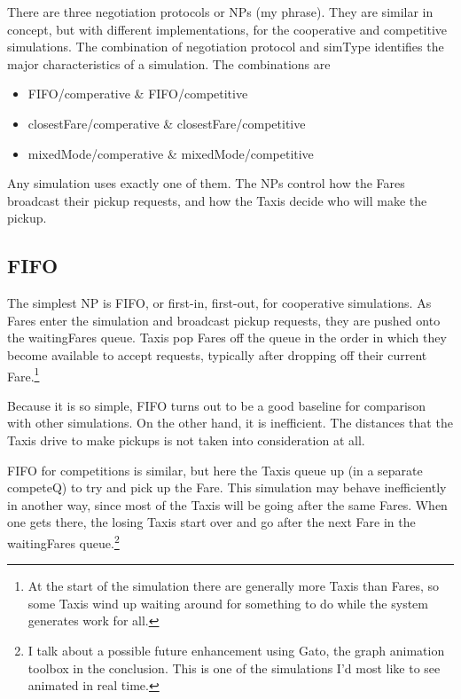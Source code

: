 \documentclass[11pt,letterpaper,onecolumn,twoside,openright,draft]{report}
\begin{document}
There are three negotiation protocols or NPs (my phrase).
They are similar in concept, but with different implementations, for the cooperative and competitive simulations.
The combination of negotiation protocol and simType identifies the major characteristics of a simulation.
The combinations are

\begin{itemize}
  \item{FIFO/comperative \& FIFO/competitive}
  \item{closestFare/comperative \& closestFare/competitive}
  \item{mixedMode/comperative \& mixedMode/competitive}
\end{itemize}

Any simulation uses exactly one of them.
The NPs control how the Fares broadcast their pickup requests, and how the Taxis decide who will make the pickup.

\subsection{FIFO}
The simplest NP is FIFO, or first-in, first-out, for cooperative simulations.
As Fares enter the simulation and broadcast pickup requests, they are pushed onto the waitingFares queue.
Taxis pop Fares off the queue in the order in which they become available to accept requests, typically after dropping off their current Fare.\footnote{At the start of the simulation there are generally more Taxis than Fares, so some Taxis wind up waiting around for something to do while the system generates work for all.}

Because it is so simple, FIFO turns out to be a good baseline for comparison with other simulations.
On the other hand, it is inefficient.
The distances that the Taxis drive to make pickups is not taken into consideration at all.

FIFO for competitions is similar, but here the Taxis queue up (in a separate competeQ) to try and pick up the Fare.
This simulation may behave inefficiently in another way, since most of the Taxis will be going after the same Fares.
When one gets there, the losing Taxis start over and go after the next Fare in the waitingFares queue.\footnote{I talk about a possible future enhancement using Gato, the graph animation toolbox in the conclusion. This is one of the simulations I'd most like to see animated in real time.}
\end{document}
